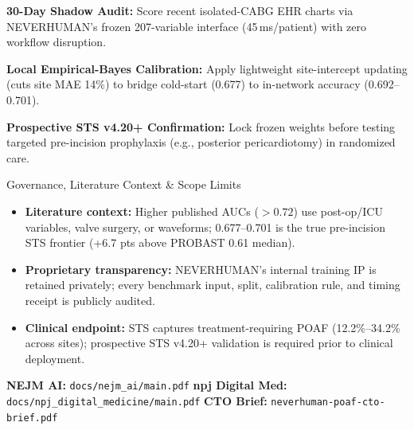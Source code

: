\documentclass[10pt,letterpaper]{article}
\begin{document}
\vspace{4.5pt}

\noindent
\begin{minipage}[t]{0.485\textwidth}
  \vspace{0pt}
  {\fontsize{7.7}{9.7}\selectfont
  \hspace{4pt}\textbf{30-Day Shadow Audit:} Score recent isolated-CABG EHR charts via NEVERHUMAN's frozen 207-variable interface (45\,ms/patient) with zero workflow disruption.

  \vspace{3.0pt}
  \hspace{4pt}\textbf{Local Empirical-Bayes Calibration:} Apply lightweight site-intercept updating (cuts site MAE 14\%) to bridge cold-start (0.677) to in-network accuracy (0.692--0.701).

  \vspace{3.0pt}
  \hspace{4pt}\textbf{Prospective STS v4.20+ Confirmation:} Lock frozen weights before testing targeted pre-incision prophylaxis (e.g., posterior pericardiotomy) in randomized care.
  }
\end{minipage}\hfill
\begin{minipage}[t]{0.485\textwidth}
  \vspace{0pt}
  \begin{govbox}{Governance, Literature Context \& Scope Limits}
    \begin{itemize}[leftmargin=1.10em,itemsep=1.5pt,topsep=1.2pt]
      \item \textbf{Literature context:} Higher published AUCs ($>0.72$) use post-op/ICU variables, valve surgery, or waveforms; 0.677--0.701 is the true pre-incision STS frontier (+6.7 pts above PROBAST 0.61 median).
      \item \textbf{Proprietary transparency:} NEVERHUMAN's internal training IP is retained privately; every benchmark input, split, calibration rule, and timing receipt is publicly audited.
      \item \textbf{Clinical endpoint:} STS  captures treatment-requiring POAF (12.2\%--34.2\% across sites); prospective STS v4.20+ validation is required prior to clinical deployment.
    \end{itemize}
  \end{govbox}
\end{minipage}

%
  {\textbf{NEJM AI:} \texttt{docs/nejm\_ai/main.pdf} \;\textbar\; \textbf{npj Digital Med:} \texttt{docs/npj\_digital\_medicine/main.pdf} \;\textbar\; \textbf{CTO Brief:} \texttt{neverhuman-poaf-cto-brief.pdf}}%
  {\repourl}
\end{document}
